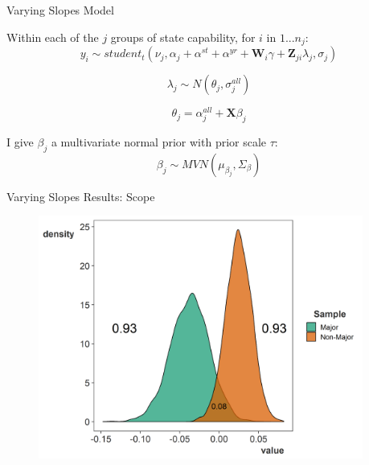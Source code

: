 \documentclass{beamer}
\begin{document}

\begin{frame}{Varying Slopes Model}

Within each of the $j$ groups of state capability, for $i$ in $1 ... n_j$: 
\begin{equation}
y_i \sim student_t(\nu_j, \alpha_j + \alpha^{st} + \alpha^{yr} +\textbf{W}_{i} \gamma  + \textbf{Z}_{ji} \lambda_{j}, \sigma_j) 
\end{equation} 

\begin{equation}
\lambda_{j} \sim N(\theta_{j}, \sigma^{all}_{j})
\end{equation} 

\begin{equation}
\theta_{j} = \alpha^{all}_{j} + \textbf{X} \beta_j
\end{equation}

I give $\beta_j$ a multivariate normal prior with prior scale $\tau$:
\begin{equation}
\beta_j \sim MVN(\mu_{\beta_j}, \Sigma_{\beta}) 
\end{equation}

\end{frame}



\begin{frame}{Varying Slopes Results: Scope}

\begin{figure}[htbp]
	\centering
		\includegraphics[width=0.95\textwidth]{var-slopes-scope.png}
\end{figure}

\end{frame}
\end{document}
